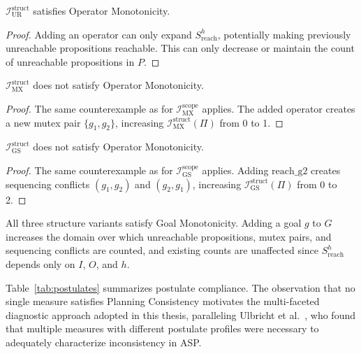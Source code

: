 \begin{prop}
    $\mathcal{I}^{\text{struct}}_{\text{UR}}$ satisfies Operator Monotonicity.
\end{prop}
\begin{proof}
    Adding an operator can only expand $S^h_{\text{reach}}$, potentially making previously unreachable propositions reachable. This can only decrease or maintain the count of unreachable propositions in $P$.
\end{proof}

\begin{prop}
    $\mathcal{I}^{\text{struct}}_{\text{MX}}$ does not satisfy Operator Monotonicity.
\end{prop}
\begin{proof}
    The same counterexample as for $\mathcal{I}^{\text{scope}}_{\text{MX}}$ applies. The added operator creates a new mutex pair $\{g_1, g_2\}$, increasing $\mathcal{I}^{\text{struct}}_{\text{MX}}(\Pi)$ from 0 to 1.
\end{proof}

\begin{prop}
    $\mathcal{I}^{\text{struct}}_{\text{GS}}$ does not satisfy Operator Monotonicity.
\end{prop}
\begin{proof}
    The same counterexample as for $\mathcal{I}^{\text{scope}}_{\text{GS}}$ applies. Adding $\text{reach\_g2}$ creates sequencing conflicts $(g_1, g_2)$ and $(g_2, g_1)$, increasing $\mathcal{I}^{\text{struct}}_{\text{GS}}(\Pi)$ from 0 to 2.
\end{proof}

All three structure variants satisfy Goal Monotonicity. Adding a goal $g$ to $G$ increases the domain over which unreachable propositions, mutex pairs, and sequencing conflicts are counted, and existing counts are unaffected since $S^h_{\text{reach}}$ depends only on $I$, $O$, and $h$.

Table~\ref{tab:postulates} summarizes postulate compliance. The observation that no single measure satisfies Planning Consistency motivates the multi-faceted diagnostic approach adopted in this thesis, paralleling Ulbricht et al.~\cite{Ulbricht2016}, who found that multiple measures with different postulate profiles were necessary to adequately characterize inconsistency in \ac{ASP}.

